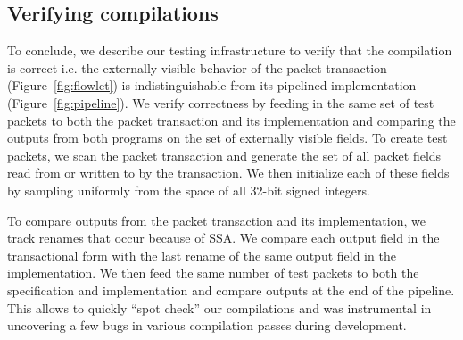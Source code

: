 \subsection{Verifying compilations}

To conclude, we describe our testing infrastructure to verify that the
compilation is correct i.e. the externally visible behavior of the packet
transaction (Figure~\ref{fig:flowlet}) is indistinguishable from its pipelined
implementation (Figure~\ref{fig:pipeline}). We verify correctness by feeding in
the same set of test packets to both the packet transaction and its
implementation and comparing the outputs from both programs on the set of
externally visible fields. To create test packets, we scan the packet
transaction and generate the set of all packet fields read from or written to
by the transaction. We then initialize each of these fields by sampling
uniformly from the space of all 32-bit signed integers.

To compare outputs from the packet transaction and its implementation, we track
renames that occur because of SSA. We compare each output field in the
transactional form with the last rename of the same output field in the
implementation. We then feed the same number of test packets to both the
specification and implementation and compare outputs at the end of the
pipeline. This allows to quickly ``spot check'' our compilations and was
instrumental in uncovering a few bugs in various compilation passes during
development.
